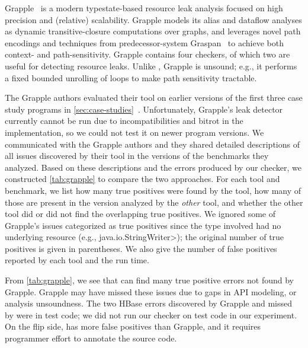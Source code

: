 Grapple~\cite{zuo2019grapple} is a modern typestate-based resource leak analysis
focused on high precision and (relative) scalability. Grapple models its alias and
dataflow analyses as dynamic transitive-closure computations over graphs, and
leverages novel path encodings and techniques from predecessor-system
Graspan~\cite{wang2017graspan} to achieve both context- and path-sensitivity.  
Grapple contains four checkers, of which two are useful for detecting
resource leaks.  Unlike \tool, Grapple is unsound; e.g., it performs a fixed bounded unrolling
of loops to make path sensitivity tractable.

The Grapple authors evaluated their tool on earlier versions of the first three
case study programs in \cref{sec:case-studies}~\cite{zuo2019grapple}.
Unfortunately, Grapple's leak detector currently cannot be run due to
incompatibilities and bitrot in the implementation, so we could not test it on
newer program versions.  We communicated with the Grapple authors and they
shared detailed descriptions of all issues discovered by their tool in the
versions of the benchmarks they analyzed.  Based on these descriptions and the
errors produced by our checker, we constructed \cref{tab:grapple} to compare the
two approaches.  For each tool and benchmark, we list how many true positives
were found by the tool, how many of those are present in the version analyzed by
the \emph{other} tool, and whether the other tool did or did not find the
overlapping true positives.  We ignored some of Grapple's issues categorized as
true positives since the type involved had no underlying resource (e.g.,
\<java.io.StringWriter>); the original number of true positives is given in
parentheses.  We also give the number of false positives reported by each tool and the run
time.

From \cref{tab:grapple}, we see that \tool can find many true positive errors
not found by Grapple.  Grapple may have missed these issues due to gaps in API
modeling, or analysis unsoundness.  The two HBase errors discovered by Grapple
and missed by \tool were in test code; we did not run our checker on test code
in our experiment.  On the flip side, \tool has more false positives
than Grapple, and it requires programmer effort to annotate the source code.  

